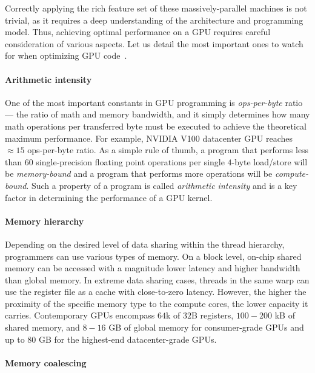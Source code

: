 Correctly applying the rich feature set of these massively-parallel machines is not trivial, as it requires a deep understanding of the architecture and programming model. Thus, achieving optimal performance on a GPU requires careful consideration of various aspects. Let us detail the most important ones to watch for when optimizing GPU code~\cite{pratx2011gpu}.

\paragraph{Arithmetic intensity}
\label{sec:arithmetic_int}

One of the most important constants in GPU programming is \emph{ops-per-byte} ratio ---  the ratio of math and memory bandwidth, and it simply determines how many math operations per transferred byte must be executed to achieve the theoretical maximum performance. For example, NVIDIA V100 datacenter GPU reaches $\approx15$ ops-per-byte ratio. As a simple rule of thumb, a program that performs less than $60$ single-precision floating point operations per single $4$-byte load/store will be \emph{memory-bound} and a program that performs more operations will be \emph{compute-bound}. Such a property of a program is called \emph{arithmetic intensity} and is a key factor in determining the performance of a GPU kernel.

\paragraph{Memory hierarchy}
\label{sec:memory_hier}

Depending on the desired level of data sharing within the thread hierarchy, programmers can use various types of memory. On a block level, on-chip shared memory can be accessed with a magnitude lower latency and higher bandwidth than global memory. In extreme data sharing cases, threads in the same warp can use the register file as a cache with close-to-zero latency. However, the higher the proximity of the specific memory type to the compute cores, the lower capacity it carries. Contemporary GPUs encompass $64$k of $32$B registers, $100-200$ kB of shared memory, and $8-16$ GB of global memory for consumer-grade GPUs and up to $80$ GB for the highest-end datacenter-grade GPUs.

\paragraph{Memory coalescing}
\label{sec:coalescing}

